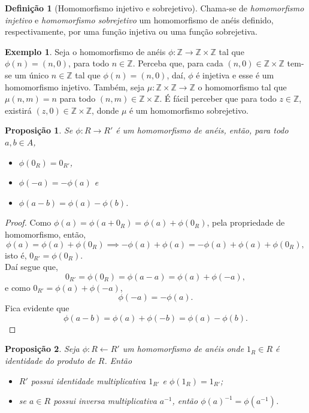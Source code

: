 \documentclass[a4paper,12pt]{report}
\theoremstyle{plain}
\newtheorem{proposicao}{Proposição}[section]
\theoremstyle{definition}
\newtheorem{definicao}{Definição}[section]
\newtheorem{exemplo}{Exemplo}[section]
\begin{document}
	\begin{definicao}[Homomorfismo injetivo e sobrejetivo]
		Chama-se de \emph{homomorfismo injetivo} e \emph{homomorfismo sobrejetivo} um homomorfismo de anéis definido, respectivamente, por uma função injetiva ou uma função sobrejetiva.
	\end{definicao}
	
	\begin{exemplo}
		Seja o homomorfismo de anéis $\phi: \mathbb{Z} \longrightarrow \mathbb{Z}\times \mathbb{Z}$ tal que $\phi(n) = (n,0)$, para todo $n\in\mathbb{Z}$. Perceba que, para cada $(n,0)\in \mathbb{Z}\times \mathbb{Z}$ tem-se um único $n\in \mathbb{Z}$ tal que $\phi(n) = (n,0)$, daí, $\phi$ é injetiva e esse é um homomorfismo injetivo. Também, seja $\mu:\mathbb{Z}\times\mathbb{Z} \longrightarrow \mathbb{Z}$ o homomorfismo tal que $\mu(n,m) = n$ para todo $(n,m)\in \mathbb{Z}\times \mathbb{Z}$. É fácil perceber que para todo $z\in \mathbb{Z}$, existirá $(z,0)\in \mathbb{Z}\times \mathbb{Z}$, donde $\mu$ é um homomorfismo sobrejetivo.
	\end{exemplo}
	
	\begin{proposicao}
		Se $\phi: R \longrightarrow R'$ é um homomorfismo de anéis, então, para todo $a,b\in A$,
		\begin{itemize}
			\item $\phi(0_R) = 0_{R'}$,
			\item $\phi(-a) = -\phi(a)$ e
			\item $\phi(a-b) = \phi(a) - \phi(b)$.
		\end{itemize} 	
	\end{proposicao}
	\begin{proof}
		Como $\phi(a) = \phi(a+0_R) = \phi(a)+\phi(0_R)$, pela propriedade de homomorfismo, então, $$\phi(a) = \phi(a)+\phi(0_R) \implies -\phi(a)+\phi(a) = -\phi(a)+\phi(a)+\phi(0_R),$$ isto é, $0_{R'} = \phi(0_R)$.
		\\
		
		\noindent Daí segue que, $$0_{R'} = \phi(0_R) = \phi(a - a) = \phi(a) + \phi(-a),$$
		e como $0_{R'} = \phi(a) + \phi(-a)$, $$\phi(-a) = -\phi(a).$$
		\noindent Fica evidente que $$\phi(a-b) = \phi(a) + \phi(-b) = \phi(a) - \phi(b).$$
	\end{proof}
	
	\begin{proposicao}
		Seja $\phi:R \longleftarrow	R'$ um homomorfismo de anéis onde $1_R \in R$ é identidade do produto de $R$. Então
		\begin{itemize}
			\item $R'$ possui identidade multiplicativa $1_{R'}$ e $\phi(1_R) = 1_{R'}$;
			\item se $a\in R$ possui inversa multiplicativa $a^{-1}$, então $\phi(a)^{-1} = \phi(a^{-1})$.
		\end{itemize}	
	\end{proposicao}
	
\end{document}
